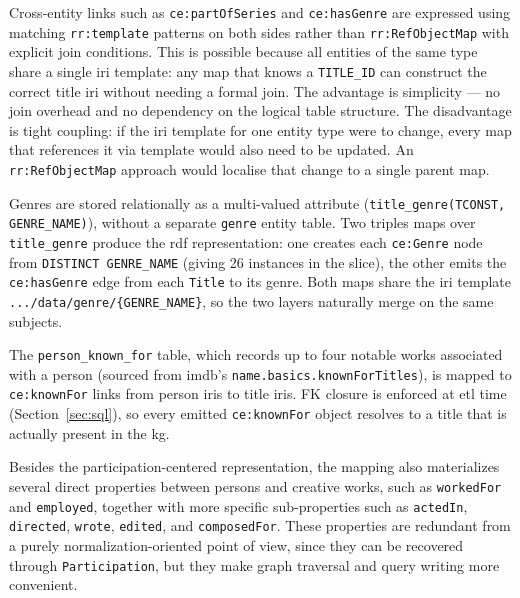 Cross-entity links such as \texttt{ce:partOfSeries} and \texttt{ce:hasGenre} are expressed using matching \texttt{rr:template} patterns on both sides rather than \texttt{rr:RefObjectMap} with explicit join conditions. This is possible because all entities of the same type share a single \ac{iri} template: any map that knows a \texttt{TITLE\_ID} can construct the correct title \ac{iri} without needing a formal join. The advantage is simplicity --- no join overhead and no dependency on the logical table structure. The disadvantage is tight coupling: if the \ac{iri} template for one entity type were to change, every map that references it via template would also need to be updated. An \texttt{rr:RefObjectMap} approach would localise that change to a single parent map.

Genres are stored relationally as a multi-valued attribute (\texttt{title\_genre(TCONST, GENRE\_NAME)}), without a separate \texttt{genre} entity table. Two triples maps over \texttt{title\_genre} produce the \ac{rdf} representation: one creates each \texttt{ce:Genre} node from \texttt{DISTINCT GENRE\_NAME} (giving 26 instances in the slice), the other emits the \texttt{ce:hasGenre} edge from each \texttt{Title} to its genre. Both maps share the \ac{iri} template \texttt{.../data/genre/\{GENRE\_NAME\}}, so the two layers naturally merge on the same subjects.

The \texttt{person\_known\_for} table, which records up to four notable works associated with a person (sourced from \ac{imdb}'s \texttt{name.basics.knownForTitles}), is mapped to \texttt{ce:knownFor} links from person \acp{iri} to title \acp{iri}. FK closure is enforced at \ac{etl} time (Section~\ref{sec:sql}), so every emitted \texttt{ce:knownFor} object resolves to a title that is actually present in the \ac{kg}.

Besides the participation-centered representation, the mapping also materializes several direct properties between persons and creative works, such as \texttt{workedFor} and \texttt{employed}, together with more specific sub-properties such as \texttt{actedIn}, \texttt{directed}, \texttt{wrote}, \texttt{edited}, and \texttt{composedFor}. These properties are redundant from a purely normalization-oriented point of view, since they can be recovered through \texttt{Participation}, but they make graph traversal and query writing more convenient.

